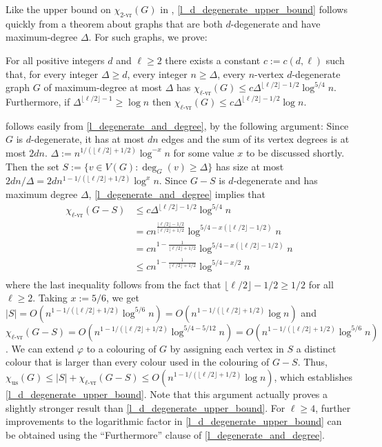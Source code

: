 \documentclass{patmorin}
\newcommand{\rn}[1]{\chi_{\operatorname{#1-vr}}}
\newcommand{\trn}{\chi_{\mathrm{us}}}
\newcommand{\lrn}{\rn{\ell}}
\newcommand{\texp}{1-1/(\lfloor\ell/2\rfloor+1/2)}
\newcommand{\dexp}{1-\frac{1}{\lfloor\ell/2\rfloor+1/2}}
\begin{document}
Like the upper bound on $\rn{2}(G)$ in \cite{karpas.neiman.ea:on}, \cref{l_d_degenerate_upper_bound} follows quickly from a theorem about graphs that are both $d$-degenerate and have maximum-degree $\Delta$. For such graphs, we prove:

\begin{thm}\label{l_degenerate_and_degree}
  For all positive integers $d$ and $\ell\ge 2$ there exists a constant $c:=c(d,\ell)$ such that, for every integer $\Delta\ge d$, every integer $n\ge \Delta$, every $n$-vertex $d$-degenerate graph $G$ of maximum-degree at most $\Delta$ has $\lrn(G)\le c\Delta^{\lfloor\ell/2\rfloor-1/2}\log^{5/4} n$.  Furthermore, if $\Delta^{\lfloor\ell/2\rfloor-1}\ge\log n$ then $\lrn(G)\le c\Delta^{\lfloor\ell/2\rfloor-1/2}\log n$.
\end{thm}

 follows easily from \cref{l_degenerate_and_degree}, by the following argument:  Since $G$ is $d$-degenerate, it has at most $dn$ edges and the sum of its vertex degrees is at most $2dn$.  $\Delta:=n^{1/(\lfloor\ell/2\rfloor+1/2)}\log^{-x} n$ for some value $x$ to be discussed shortly.  Then the set $S:=\{v\in V(G):\deg_G(v)\ge \Delta\}$ has size at most $2dn/\Delta=2dn^{\texp}\log^x n$.  Since $G-S$ is $d$-degenerate and has maximum degree $\Delta$, \cref{l_degenerate_and_degree} implies that
\begin{align*}
  \lrn(G-S) &
  \le c\Delta^{\lfloor\ell/2\rfloor-1/2}\log^{5/4} n \\
  & = cn^{\frac{\lfloor\ell/2\rfloor-1/2}{\lfloor\ell/2\rfloor+1/2}}\log^{5/4-x(\lfloor\ell/2\rfloor-1/2)} n \\
  & = cn^{\dexp}\log^{5/4-x(\lfloor\ell/2\rfloor-1/2)} n \\
  & \le cn^{\dexp}\log^{5/4-x/2} n \\
\end{align*}
where the last inequality follows from the fact that $\lfloor\ell/2\rfloor-1/2\ge 1/2$ for all $\ell\ge 2$.  Taking $x:=5/6$, we get $|S|=O(n^{\texp}\log^{5/6} n)=O(n^{\texp}\log n)$ and  $\lrn(G-S)= O(n^{\texp}\log^{5/4-5/12} n)
= O(n^{\texp}\log^{5/6} n)$.  We can extend $\varphi$ to a colouring of $G$ by assigning each vertex in $S$ a distinct colour that is larger than every colour used in the colouring of $G-S$.  Thus, $\trn(G)\le |S|+\lrn(G-S) \le O(n^{\texp}\log n)$, which establishes \cref{l_d_degenerate_upper_bound}.  Note that this argument actually proves a slightly stronger result than \cref{l_d_degenerate_upper_bound}.  For $\ell\ge 4$, further improvements to the logarithmic factor in \cref{l_d_degenerate_upper_bound} can be obtained using the ``Furthermore'' clause of \cref{l_degenerate_and_degree}.
\end{document}
